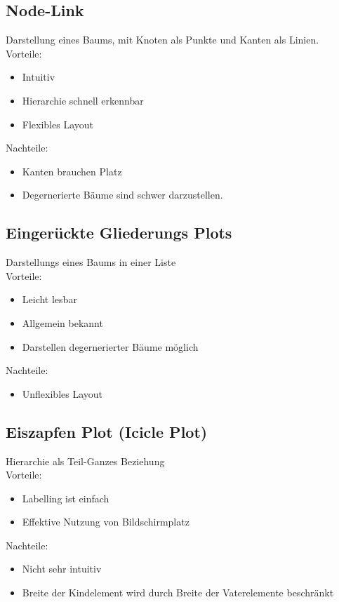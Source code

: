 \documentclass[ngerman]{scrartcl}
\begin{document}
\subsection{Node-Link}
Darstellung eines Baums, mit Knoten als Punkte und Kanten als Linien. \\
Vorteile: 
\begin{itemize}
  \item Intuitiv
  \item Hierarchie schnell erkennbar
  \item Flexibles Layout
\end{itemize}
Nachteile:
\begin{itemize}
  \item Kanten brauchen Platz
  \item Degernerierte Bäume sind schwer darzustellen.
\end{itemize}

\subsection{Eingerückte Gliederungs Plots}
Darstellungs eines Baums in einer Liste \\
Vorteile: 
\begin{itemize}
  \item Leicht lesbar
  \item Allgemein bekannt
  \item Darstellen degernerierter Bäume möglich
\end{itemize}
Nachteile:
\begin{itemize}
  \item Unflexibles Layout
\end{itemize}

\subsection{Eiszapfen Plot (Icicle Plot)}
Hierarchie als Teil-Ganzes Beziehung \\
Vorteile: 
\begin{itemize}
  \item Labelling ist einfach
  \item Effektive Nutzung von Bildschirmplatz
\end{itemize}
Nachteile:
\begin{itemize}
  \item Nicht sehr intuitiv
  \item Breite der Kindelement wird durch Breite der Vaterelemente beschränkt
\end{itemize}
\end{document}
